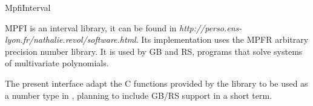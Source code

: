 %
%
%
%
% 
%

\begin{ccPkgDescription}{MpfiInterval \label{MpfiInterval}}

MPFI is an interval library, it can be found in
\emph{http://perso.ens-lyon.fr/nathalie.revol/software.html}.
Its implementation uses the MPFR arbitrary precision number library.
It is used by GB and RS, programs that solve systems of multivariate
polynomials.

The present interface adapt the C functions provided by the library to be
used as a number type in {\cgal}, planning to include GB/RS support in a
short term.


\end{ccPkgDescription}
